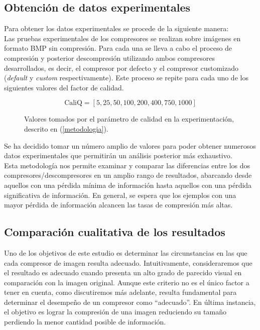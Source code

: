 \documentclass[12pt,a4paper]{article}
\begin{document}
\subsection{Obtención de datos experimentales}
Para obtener los datos experimentales se procede de la siguiente manera:\\

Las pruebas experimentales de los compresores se realizan sobre imágenes en formato BMP sin compresión. Para cada una se lleva a cabo el proceso de compresión y posterior descompresión utilizando ambos compresores desarrollados, es decir, el compresor por defecto y el compresor customizado (\textit{default} y \textit{custom} respectivamente). Este proceso se repite para cada uno de los siguientes valores del factor de calidad.\\
\begin{figure}[H]
    \centering
\[
\text{CaliQ} = [5,25,50,100,200,400,750,1000]
\]
    \caption[Valores tomados por el parámetro CaliQ]{Valores tomados por el parámetro de calidad en la experimentación, descrito en (\ref{metodologia}).}
    
\end{figure}

Se ha decidido tomar un número amplio de valores para poder obtener numerosos datos experimentales que permitirán un análisis posterior más exhaustivo.\\

Esta metodología nos permite examinar y comparar las diferencias entre los dos compresores/descompresores en un amplio rango de resultados, abarcando desde aquellos con una pérdida mínima de información hasta aquellos con una pérdida significativa de información. En general, se espera que los ejemplos con una mayor pérdida de información alcancen las tasas de compresión más altas.

\subsection{Comparación cualitativa de los resultados}
Uno de los objetivos de este estudio es determinar las circunstancias en las que cada compresor de imagen resulta adecuado. Intuitivamente, consideraremos que el resultado es adecuado cuando presenta un alto grado de parecido visual en comparación con la imagen original. Aunque este criterio no es el único factor a tener en cuenta, como discutiremos más adelante, resulta fundamental para determinar el desempeño de un compresor como ``adecuado''. En última instancia, el objetivo es lograr la compresión de una imagen reduciendo su tamaño perdiendo la menor cantidad posible de información.\\
\end{document}
